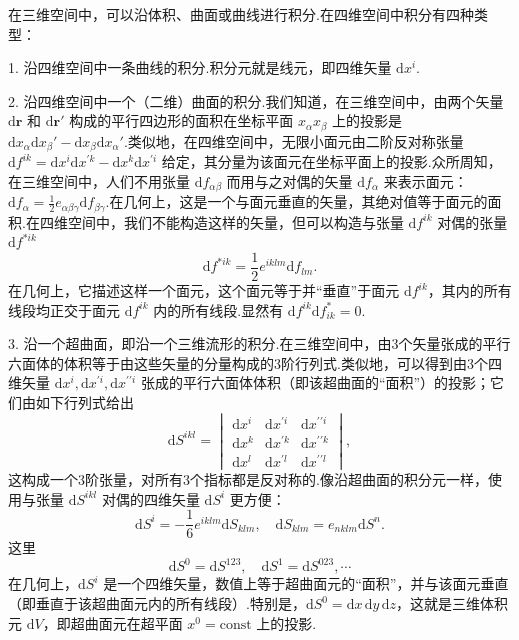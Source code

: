 在三维空间中，可以沿体积、曲面或曲线进行积分.在四维空间中积分有四种类型：

1. 沿四维空间中一条曲线的积分.积分元就是线元，即四维矢量 $\mathrm{d}x^i$.

2. 沿四维空间中一个（二维）曲面的积分.我们知道，在三维空间中，由两个矢量 $\mathrm{d}\boldsymbol{r}$ 和 $\mathrm{d}\boldsymbol{r}'$ 构成的平行四边形的面积在坐标平面 $x_\alpha x_\beta$ 上的投影是 $\mathrm{d}x_\alpha\mathrm{d}x_\beta'-\mathrm{d}x_\beta\mathrm{d}x_\alpha'$.类似地，在四维空间中，无限小面元由二阶反对称张量 $\mathrm{d}f^{ik}=\mathrm{d}x^i\mathrm{d}x^{\prime k}-\mathrm{d}x^k\mathrm{d}x^{\prime i}$ 给定，其分量为该面元在坐标平面上的投影.众所周知，在三维空间中，人们不用张量 $\mathrm{d}f_{\alpha\beta}$ 而用与之对偶的矢量 $\mathrm{d}f_\alpha$ 来表示面元：$\mathrm{d}f_\alpha=\frac{1}{2}e_{\alpha\beta\gamma}\mathrm{d}f_{\beta\gamma}$.在几何上，这是一个与面元垂直的矢量，其绝对值等于面元的面积.在四维空间中，我们不能构造这样的矢量，但可以构造与张量 $\mathrm{d}f^{ik}$ 对偶的张量 $\mathrm{d}f^{*ik}$
\begin{equation}
  \mathrm{d}f^{*ik}=\frac{1}{2}e^{iklm}\mathrm{d}f_{lm}.
\end{equation}
在几何上，它描述这样一个面元，这个面元等于并“垂直”于面元 $\mathrm{d}f^{ik}$，其内的所有线段均正交于面元 $\mathrm{d}f^{ik}$ 内的所有线段.显然有 $\mathrm{d}f^{ik}\mathrm{d}f^{*}_{ik}=0$.

3. 沿一个超曲面，即沿一个三维流形的积分.在三维空间中，由3个矢量张成的平行六面体的体积等于由这些矢量的分量构成的3阶行列式.类似地，可以得到由3个四维矢量 $\mathrm{d}x^i,\mathrm{d}x^{\prime i},\mathrm{d}x^{\prime\prime i}$ 张成的平行六面体体积（即该超曲面的“面积”）的投影；它们由如下行列式给出
\begin{equation*}
  \mathrm{d}S^{ikl}=\begin{vmatrix}
    \mathrm{d}x^i & \mathrm{d}x^{\prime i} & \mathrm{d}x^{\prime\prime i}\\
    \mathrm{d}x^k & \mathrm{d}x^{\prime k} & \mathrm{d}x^{\prime\prime k}\\
    \mathrm{d}x^l & \mathrm{d}x^{\prime l} & \mathrm{d}x^{\prime\prime l}
  \end{vmatrix},
\end{equation*}
这构成一个3阶张量，对所有3个指标都是反对称的.像沿超曲面的积分元一样，使用与张量 $\mathrm{d}S^{ikl}$ 对偶的四维矢量 $\mathrm{d}S^i$ 更方便：
\begin{equation}
  \mathrm{d}S^i=-\frac{1}{6}e^{iklm}\mathrm{d}S_{klm},\quad
  \mathrm{d}S_{klm}=e_{nklm}\mathrm{d}S^n.
\end{equation}
这里
\begin{equation*}
  \mathrm{d}S^0=\mathrm{d}S^{123},\quad \mathrm{d}S^1=\mathrm{d}S^{023},\cdots
\end{equation*}
在几何上，$\mathrm{d}S^i$ 是一个四维矢量，数值上等于超曲面元的“面积”，并与该面元垂直（即垂直于该超曲面元内的所有线段）.特别是，$\mathrm{d}S^0=\mathrm{d}x\,\mathrm{d}y\,\mathrm{d}z$，这就是三维体积元 $\mathrm{d}V$，即超曲面元在超平面 $x^0=\mathrm{const}$ 上的投影.

